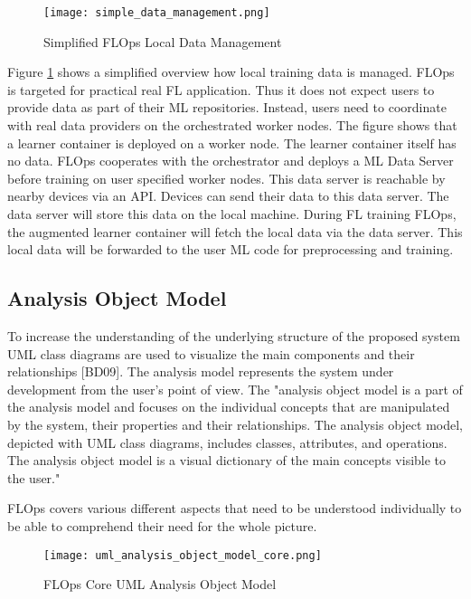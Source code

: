 \begin{figure}[h]
    \centering
    \texttt{[image: simple\_data\_management.png]}
    \caption{Simplified FLOps Local Data Management}
    \label{fig:flops_simple_data_management}
\end{figure}

Figure \ref{fig:flops_simple_data_management} shows a simplified overview how local training data is managed.
FLOps is targeted for practical real FL application.
Thus it does not expect users to provide data as part of their ML repositories.
Instead, users need to coordinate with real data providers on the orchestrated worker nodes.
The figure shows that a learner container is deployed on a worker node.
The learner container itself has no data. 
FLOps cooperates with the orchestrator and deploys a ML Data Server before training on user specified worker nodes.
This data server is reachable by nearby devices via an API.
Devices can send their data to this data server.
The data server will store this data on the local machine.
During FL training FLOps, the augmented learner container will fetch the local data via the data server.
This local data will be forwarded to the user ML code for preprocessing and training.



\subsection{Analysis Object Model}
To increase the understanding of the underlying structure of the proposed
system UML class diagrams are used to visualize the main components and
their relationships [BD09].
The analysis model represents the system under development from the user’s point of view. The
"analysis object model is a part of the analysis model and focuses on the individual concepts that
are manipulated by the system, their properties and their relationships. The analysis object
model, depicted with UML class diagrams, includes classes, attributes, and operations. The
analysis object model is a visual dictionary of the main concepts visible to the user."

FLOps covers various different aspects that need to be understood individually to be able to comprehend their need for the whole picture.



\begin{figure}[h]
    \centering
    \texttt{[image: uml\_analysis\_object\_model\_core.png]}
    \caption{FLOps Core UML Analysis Object Model}
    \label{fig:uml_core_analysis_object_model}
\end{figure}

